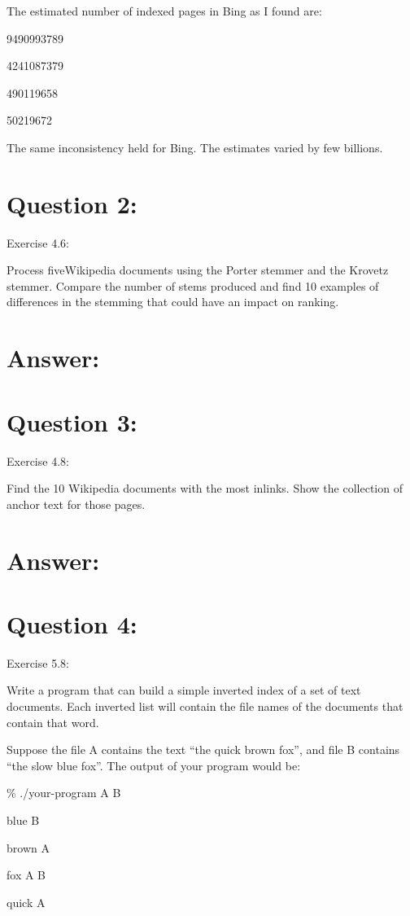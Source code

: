 \documentclass[a4paper, 11pt]{article}
\begin{document}
The estimated number of indexed pages in Bing as I found are:

9490993789

4241087379

490119658

50219672

The same inconsistency held for Bing. The estimates varied by few billions.


\section*{Question 2:}
Exercise 4.6:

Process fiveWikipedia documents using the Porter stemmer and the Krovetz stemmer. Compare the number of stems produced and find 10 examples of differences in the stemming that could have an impact on ranking.

\section*{Answer:}

\section*{Question 3:}
Exercise 4.8:

Find the 10 Wikipedia documents with the most inlinks. Show the collection
of anchor text for those pages.

\section*{Answer:}


\section*{Question 4:}
Exercise 5.8: 

Write a program that can build a simple inverted index of a set of text documents. Each inverted list will contain the file names of the documents that contain that word.

Suppose the file A contains the text “the quick brown fox”, and file B contains “the slow blue fox”. The output of your program would be:

\% ./your-program A B

blue B

brown A

fox A B

quick A
\end{document}
